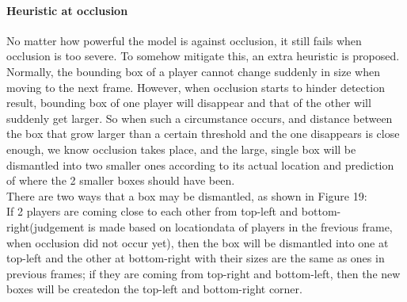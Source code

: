 \documentclass{article}
\begin{document}
\paragraph{Heuristic at occlusion}
No matter how powerful the model is against occlusion, it still fails when occlusion is too severe. To somehow mitigate this, an extra heuristic is proposed.\\
Normally, the bounding box of a player cannot change suddenly in size when moving to the next frame. However, when occlusion starts to hinder detection result, bounding box of one player will disappear and that of the other will suddenly get larger. 
So when such a circumstance occurs, and distance between the box that grow larger than a certain threshold and the one disappears is close enough, we know occlusion takes place, and the large, single box will be dismantled into two smaller ones according to its actual location and prediction of where the 2 smaller boxes should have been.\\
There are two ways that a box may be dismantled, as shown in Figure 19:\\
If 2 players are coming close to each other from top-left and bottom-right(judgement is made based on locationdata of players in the frevious frame, when occlusion did not occur yet), then the box will be dismantled into one at top-left and the other at bottom-right with their sizes are the same as ones in previous frames; if they are coming from top-right and bottom-left, then the new boxes will be createdon the top-left and bottom-right corner.
\end{document}
